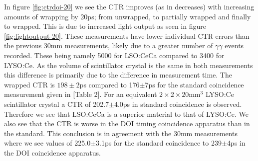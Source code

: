 In figure \ref{fig:ctrdoi-20} we see the CTR improves (as in decreases) with increasing amounts of wrapping by 20ps; from unwrapped, to partially wrapped and finally to wrapped. This is due to increased light output as seen in figure \ref{fig:lightoutput-20}. These measurements have lower individual CTR errors than the previous 30mm measurements, likely due to a greater number of $\gamma\gamma$ events recorded. These being namely 5000 for LSO:CeCa compared to 3400 for LYSO:Ce. As the volume of scintillator crystal is the same in both measurements this difference is primarily due to the difference in measurement time. The wrapped CTR is $198\pm2$ps compared to 176$\pm$7ps for the standard coincidence measurement given in [Table 2]\cite{uffray_Jarron_Meyer_Lecoq_2014}. For an equivalent $2\times2\times20$mm$^3$ LYSO:Ce scintillator crystal a CTR of 202.7$\pm$4.0ps in standard coincidence is observed. Therefore we see that LSO:CeCa is a superior material to that of LYSO:Ce. We also see that the CTR is worse in the DOI timing coincidence apparatus than in the standard. This conclusion is in agreement with the 30mm measurements where we see values of 225.0$\pm$3.1ps for the standard coincidence to 239$\pm$4ps in the DOI coincidence apparatus.